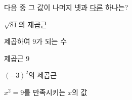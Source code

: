 다음 중 그 값이 나머지 넷과 \underline{다른} 하나는?
\begin{choicesii}{\rule[-3ex]{0pt}{8ex}$\sqrt{81}$의 제곱근}{\rule[-3ex]{0pt}{8ex}제곱하여 $9$가 되는 수}{\rule[-3ex]{0pt}{8ex}제곱근 $9$}{\rule[-3ex]{0pt}{8ex}$(-3)^2$의 제곱근}{\rule[-3ex]{0pt}{8ex}$x^2=9$를 만족시키는 $x$의 값}\end{choicesii}
